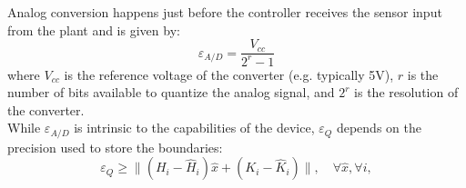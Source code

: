 %
%
 	Analog conversion happens just before the controller receives the sensor input from the plant
 	and is given by:
 	\begin{equation*}
 	\varepsilon_{A/D}=\frac{V_{cc}}{2^{r}-1}
 	\end{equation*}
 	where $V_{cc}$ is the reference voltage of the converter (e.g. typically 5V), $r$
 	is the number of bits available to quantize the analog signal, and $2^{r}$ is
 	the resolution of the converter.\\
 	While $\varepsilon_{A/D}$ is intrinsic to the capabilities of the device,
 	$\varepsilon_{Q}$ depends on the precision used to store the boundaries:
 	\begin{equation}\label{eq:quantizationlines}
 	\varepsilon_{Q} \ge  \|(H_i - \hat{H}_i) \hat{x} + (K_i - \hat{K}_i)\|, \quad \forall \hat{x},\forall i,
 	\end{equation}
